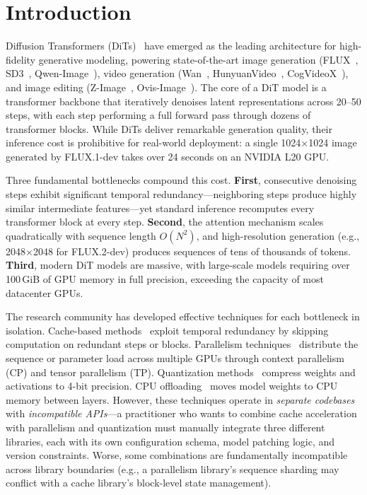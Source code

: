 \documentclass[10pt]{article}
\begin{document}
\section{Introduction}

Diffusion Transformers (DiTs)~\cite{peebles2023scalable} have emerged as the leading architecture for high-fidelity generative modeling, powering state-of-the-art image generation (FLUX~\cite{flux2024}, SD3~\cite{esser2024scaling}, Qwen-Image~\cite{qwenimage2025}), video generation (Wan~\cite{wan2025}, HunyuanVideo~\cite{hunyuanvideo2024}, CogVideoX~\cite{yang2024cogvideox}), and image editing (Z-Image~\cite{zimage2025}, Ovis-Image~\cite{ovisimage2025}). The core of a DiT model is a transformer backbone that iteratively denoises latent representations across 20--50 steps, with each step performing a full forward pass through dozens of transformer blocks. While DiTs deliver remarkable generation quality, their inference cost is prohibitive for real-world deployment: a single 1024$\times$1024 image generated by FLUX.1-dev takes over 24 seconds on an NVIDIA L20 GPU.

Three fundamental bottlenecks compound this cost. \textbf{First}, consecutive denoising steps exhibit significant temporal redundancy---neighboring steps produce highly similar intermediate features---yet standard inference recomputes every transformer block at every step. \textbf{Second}, the attention mechanism scales quadratically with sequence length $O(N^2)$, and high-resolution generation (e.g., 2048$\times$2048 for FLUX.2-dev) produces sequences of tens of thousands of tokens. \textbf{Third}, modern DiT models are massive, with large-scale models requiring over 100\,GiB of GPU memory in full precision, exceeding the capacity of most datacenter GPUs.

The research community has developed effective techniques for each bottleneck in isolation. Cache-based methods~\cite{ma2023deepcache, liu2025teacache, silveria2025chipmunk, chen2024deltadit} exploit temporal redundancy by skipping computation on redundant steps or blocks. Parallelism techniques~\cite{jacobs2023ulysses, liu2023ring, fang2024xdit} distribute the sequence or parameter load across multiple GPUs through context parallelism (CP) and tensor parallelism (TP). Quantization methods~\cite{li2025svdquant, hanlab2025nvfp4} compress weights and activations to 4-bit precision. CPU offloading~\cite{diffusers2024} moves model weights to CPU memory between layers. However, these techniques operate in \textit{separate codebases} with \textit{incompatible APIs}---a practitioner who wants to combine cache acceleration with parallelism and quantization must manually integrate three different libraries, each with its own configuration schema, model patching logic, and version constraints. Worse, some combinations are fundamentally incompatible across library boundaries (e.g., a parallelism library's sequence sharding may conflict with a cache library's block-level state management).
\end{document}
